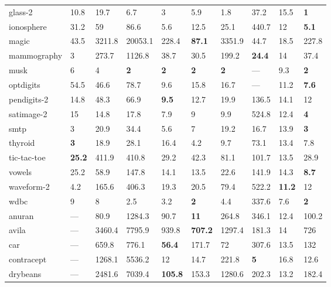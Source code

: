 \begin{table}[ht]
\begin{tabular}{l|llllllll|l}
  glass-2 & \tiny{10.8} & 19.7 & \tiny{6.7} & \tiny{3} & \tiny{5.9} & 1.8 & 37.2 & 15.5 & \textbf{1} \\ 
  ionosphere & \tiny{31.2} & 59 & 86.6 & 5.6 & 12.5 & 25.1 & \tiny{440.7} & \tiny{12} & \textbf{5.1} \\ 
  magic & \tiny{43.5} & 3211.8 & 20053.1 & 228.4 & \textbf{87.1} & \tiny{3351.9} & \tiny{44.7} & \tiny{18.5} & 227.8 \\ 
  mammography & \tiny{3} & 273.7 & \tiny{1126.8} & 38.7 & \tiny{30.5} & 199.2 & \textbf{24.4} & \tiny{14} & 37.4 \\ 
  musk & 6 & 4 & \textbf{2} & \textbf{2} & \textbf{2} & \textbf{2} & --- & 9.3 & \textbf{2} \\ 
  optdigits & 54.5 & 46.6 & 78.7 & 9.6 & 15.8 & 16.7 & --- & 11.2 & \textbf{7.6} \\ 
  pendigits-2 & 14.8 & 48.3 & 66.9 & \textbf{9.5} & 12.7 & 19.9 & 136.5 & 14.1 & 12 \\ 
  satimage-2 & 15 & 14.8 & 17.8 & 7.9 & 9 & 9.9 & \tiny{524.8} & 12.4 & \textbf{4} \\ 
  smtp & \tiny{3} & 20.9 & 34.4 & 5.6 & 7 & \tiny{19.2} & 16.7 & 13.9 & \textbf{3} \\ 
  thyroid & \textbf{3} & 18.9 & 28.1 & 16.4 & 4.2 & 9.7 & 73.1 & 13.4 & 7.8 \\ 
  tic-tac-toe & \textbf{25.2} & 411.9 & 410.8 & 29.2 & 42.3 & 81.1 & 101.7 & \tiny{13.5} & 28.9 \\ 
  vowels & 25.2 & \tiny{58.9} & 147.8 & 14.1 & 13.5 & 22.6 & 141.9 & 14.3 & \textbf{8.7} \\ 
  waveform-2 & \tiny{4.2} & \tiny{165.6} & \tiny{406.3} & 19.3 & \tiny{20.5} & 79.4 & \tiny{522.2} & \textbf{11.2} & 12 \\ 
  wdbc & \tiny{9} & 8 & 2.5 & \tiny{3.2} & \textbf{2} & \tiny{4.4} & \tiny{337.6} & 7.6 & \textbf{2} \\ 
  \hline
  anuran & --- & 80.9 & 1284.3 & 90.7 & \textbf{11} & 264.8 & 346.1 & \tiny{12.4} & 100.2 \\ 
  avila & --- & 3460.4 & 7795.9 & 939.8 & \textbf{707.2} & 1297.4 & \tiny{181.3} & \tiny{14} & 726 \\ 
  car & --- & 659.8 & 776.1 & \textbf{56.4} & 171.7 & 72 & 307.6 & \tiny{13.5} & 132 \\ 
  contracept & --- & 1268.1 & 5536.2 & 12 & 14.7 & 221.8 & \textbf{5} & \tiny{16.8} & 12.6 \\ 
  drybeans & --- & 2481.6 & 7039.4 & \textbf{105.8} & 153.3 & 1280.6 & 202.3 & \tiny{13.2} & 182.4 \\ 

\end{tabular}
\end{table}
